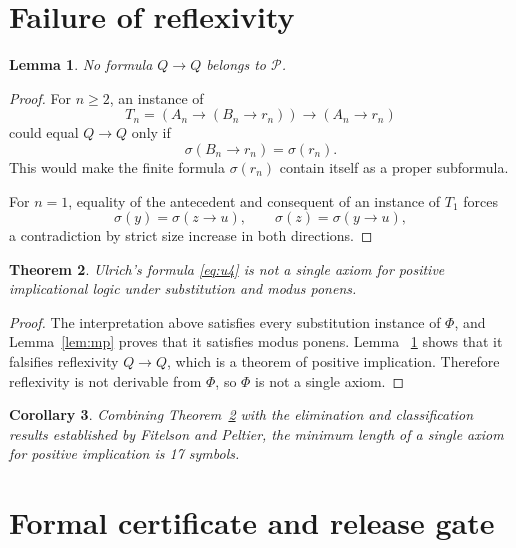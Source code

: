 \documentclass[11pt]{article}
\newtheorem{theorem}{Theorem}
\newtheorem{lemma}[theorem]{Lemma}
\newtheorem{corollary}[theorem]{Corollary}
\newcommand{\Imp}{\mathbin{\to}}
\begin{document}
\section{Failure of reflexivity}

\begin{lemma}\label{lem:refl}
No formula $Q\Imp Q$ belongs to $\mathcal P$.
\end{lemma}

\begin{proof}
For $n\ge2$, an instance of
\[
T_n=(A_n\Imp(B_n\Imp r_n))\Imp(A_n\Imp r_n)
\]
could equal $Q\Imp Q$ only if
\[
\sigma(B_n\Imp r_n)=\sigma(r_n).
\]
This would make the finite formula $\sigma(r_n)$ contain itself as a
proper subformula.

For $n=1$, equality of the antecedent and consequent of an instance of
$T_1$ forces
\[
\sigma(y)=\sigma(z\Imp u),\qquad
\sigma(z)=\sigma(y\Imp u),
\]
a contradiction by strict size increase in both directions.
\end{proof}

\begin{theorem}\label{thm:main}
Ulrich's formula \eqref{eq:u4} is not a single axiom for positive
implicational logic under substitution and modus ponens.
\end{theorem}

\begin{proof}
The interpretation above satisfies every substitution instance of $\Phi$,
and Lemma~\ref{lem:mp} proves that it satisfies modus ponens.  Lemma~
\ref{lem:refl} shows that it falsifies reflexivity $Q\Imp Q$, which is a
theorem of positive implication.  Therefore reflexivity is not derivable
from $\Phi$, so $\Phi$ is not a single axiom.
\end{proof}

\begin{corollary}
Combining Theorem~\ref{thm:main} with the elimination and classification
results established by Fitelson and Peltier, the minimum length of a single
axiom for positive implication is 17 symbols.
\end{corollary}

\section{Formal certificate and release gate}
\end{document}
